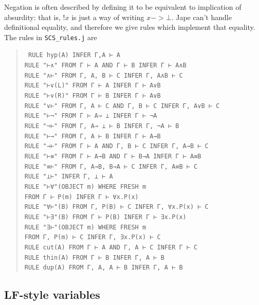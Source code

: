 Negation is often described by defining it to be equivalent to implication of absurdity: that is, $!x$ is just a way of writing $x->\bot$. Jape can't handle definitional equality, and therefore we give rules which implement that equality. The rules in \texttt{SCS\_rules.j} are
\begin{quote}\tt\small
RULE    hyp(A)                          INFER Γ,A ⊢ A\\
RULE    "⊢∧"    FROM Γ ⊢ A AND Γ ⊢ B    INFER Γ ⊢ A∧B\\
RULE    "∧⊢"    FROM Γ, A, B ⊢ C                INFER Γ, A∧B ⊢ C\\
RULE    "⊢∨(L)"     FROM  Γ ⊢ A         INFER Γ ⊢ A∨B\\
RULE    "⊢∨(R)"     FROM  Γ ⊢ B         INFER Γ ⊢ A∨B\\
RULE    "∨⊢"    FROM Γ, A ⊢ C AND Γ, B ⊢ C      INFER Γ, A∨B ⊢ C\\
RULE    "⊢¬"    FROM Γ ⊢ A→ ⊥           INFER Γ ⊢ ¬A\\
RULE    "¬⊢"    FROM Γ, A→ ⊥ ⊢ B                INFER Γ, ¬A ⊢ B\\
RULE    "⊢→"    FROM Γ, A ⊢ B           INFER Γ ⊢ A→B\\
RULE    "→⊢"    FROM Γ ⊢ A AND Γ, B ⊢ C INFER Γ, A→B ⊢ C\\
RULE    "⊢≡"    FROM Γ ⊢ A→B AND Γ ⊢ B→A        INFER Γ ⊢ A≡B\\
RULE    "≡⊢"    FROM Γ, A→B,  B→A ⊢ C   INFER Γ, A≡B ⊢ C\\
RULE    "⊥⊢"                            INFER Γ, ⊥ ⊢ A\\
RULE    "⊢∀"(OBJECT m) WHERE FRESH m\\
\tab            FROM Γ ⊢ P(m)           INFER Γ ⊢ ∀x.P(x)\\
RULE    "∀⊢"(B)     FROM Γ, P(B) ⊢ C            INFER Γ, ∀x.P(x) ⊢ C\\
RULE    "⊢∃"(B)     FROM Γ ⊢ P(B)               INFER Γ ⊢ ∃x.P(x)\\
RULE    "∃⊢"(OBJECT m) WHERE FRESH m\\
\tab              FROM  Γ, P(m) ⊢ C               INFER Γ, ∃x.P(x) ⊢ C\\
RULE    cut(A)  FROM Γ ⊢ A AND Γ, A ⊢ C INFER Γ ⊢ C\\
RULE    thin(A)     FROM Γ ⊢ B          INFER Γ, A ⊢ B\\
RULE    dup(A)  FROM Γ, A, A ⊢ B                INFER Γ, A ⊢ B
\end{quote}

\subsection{LF-style variables}

